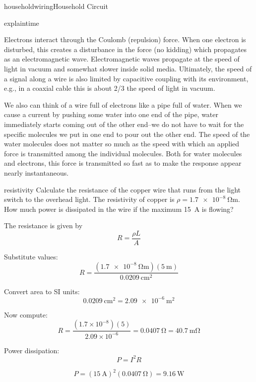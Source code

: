 \begin{mainquestion}{householdwiring}{Household Circuit}
\begin{partquestion}{explaintime}
\begin{answer}
Electrons interact through the Coulomb (repulsion) force. When one electron is disturbed, this creates a disturbance in the force (no kidding) which propagates as an electromagnetic wave. Electromagnetic waves propagate at the speed of light in vacuum and somewhat slower inside solid media. Ultimately, the speed of a signal along a wire is also limited by capacitive coupling with its environment, e.g., in a coaxial cable this is about 2/3 the speed of light in vacuum.

We also can think of a wire full of electrons like a pipe full of water. When we cause a current by pushing some water into one end of the pipe, water immediately starts coming out of the other end–we do not have to wait for the specific molecules we put in one end to pour out the other end. The speed of the water molecules does not matter so much as the speed with which an applied force is transmitted among the individual molecules. Both for water molecules and electrons, this force is transmitted so fast as to make the response appear nearly instantaneous.
\end{answer}
\end{partquestion}

\begin{partquestion}{resistivity}
{Calculate the resistance of the copper wire that runs from the light switch to the overhead light. The resistivity of copper is $\rho = \qty{1.7e-8}{\ohm\meter}$. How much power is dissipated in the wire if the maximum \qty{15}{\ampere} is flowing?}

\begin{answer}
The resistance is given by
\[
R = \frac{\rho L}{A}
\]

Substitute values:
\[
R = \frac{(\qty{1.7e-8}{\ohm\meter})(\qty{5}{\meter})}{\qty{0.0209}{\centi\meter\squared}}
\]

Convert area to SI units:
\[
\qty{0.0209}{\centi\meter\squared} = \qty{2.09e-6}{\meter\squared}
\]

Now compute:
\[
R = \frac{(1.7 \times 10^{-8})(5)}{2.09 \times 10^{-6}}
  = \qty{0.0407}{\ohm}
  = \qty{40.7}{\milli\ohm}
\]

Power dissipation:
\[
P = I^2 R
\]

\[
P = (\qty{15}{\ampere})^2 (\qty{0.0407}{\ohm})
  = \qty{9.16}{\watt}
\]

\end{answer}
\end{partquestion}


\end{mainquestion}

